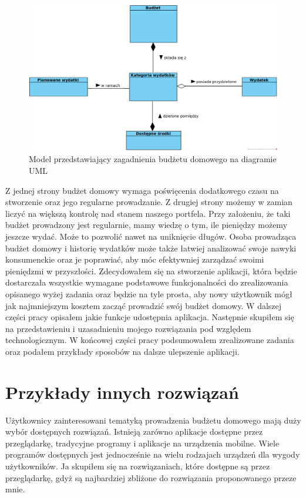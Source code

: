 \documentclass[shortabstract,inz]{iithesis}
\begin{document}
\begin{figure}
	\centering
	\includegraphics[scale=0.75]{domain-model.png}
	\caption{Model przedstawiający zagadnienia budżetu domowego na diagramie UML}
	\label{fig:domain-model}
\end{figure}

Z jednej strony budżet domowy wymaga poświęcenia dodatkowego czasu na stworzenie oraz jego regularne prowadzanie. Z drugiej strony możemy w zamian liczyć na większą kontrolę nad stanem naszego portfela. Przy założeniu, że taki budżet prowadzony jest regularnie, mamy wiedzę o tym, ile pieniędzy możemy jeszcze wydać. Może to pozwolić nawet na uniknięcie długów. Osoba prowadząca budżet domowy i historię wydatków może także łatwiej analizować swoje nawyki konsumenckie oraz je poprawiać, aby móc efektywniej zarządzać swoimi pieniędzmi w przyszłości.
\bigbreak
Zdecydowałem się na stworzenie aplikacji, która będzie dostarczała wszystkie wymagane podstawowe funkcjonalności do zrealizowania opisanego wyżej zadania oraz będzie na tyle prosta, aby nowy użytkownik mógł jak najmniejszym kosztem zacząć prowadzić swój budżet domowy. W dalszej części pracy opisałem jakie funkcje udostępnia aplikacja. Następnie skupiłem się na przedstawieniu i uzasadnieniu mojego rozwiązania pod względem technologicznym. W końcowej części pracy podsumowałem zrealizowane zadania oraz podałem przykłady sposobów na dalsze ulepszenie aplikacji.

\section{Przykłady innych rozwiązań}
Użytkownicy zainteresowani tematyką prowadzenia budżetu domowego mają duży wybór dostępnych rozwiązań. Istnieją zarówno aplikacje dostępne przez przeglądarkę, tradycyjne programy i aplikacje na urządzenia mobilne. Wiele programów dostępnych jest jednocześnie na wielu rodzajach urządzeń dla wygody użytkowników. Ja skupiłem się na rozwiązaniach, które dostępne są przez przeglądarkę, gdyż są najbardziej zbliżone do rozwiązania proponowanego przeze mnie.
\end{document}

